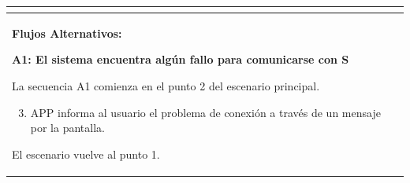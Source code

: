 \begin{longtable}{|l|p{5.5cm}|l|p{2cm}|l|p{1.9cm}|}
{				} \\ \hline

				\multicolumn{6}{|p{15cm}|}{ \textbf{Flujos Alternativos: }
				
				\textbf{A1: El sistema encuentra algún fallo para comunicarse con S}
				
				La secuencia A1 comienza en el punto 2 del escenario principal.
				\begin{enumerate}
					\setcounter{enumi}{2}
					\item APP informa al usuario el problema de conexión a través de un mensaje por la pantalla.
				\end{enumerate}

				El escenario vuelve al punto 1.

				} \\ \hline

			\end{longtable}

